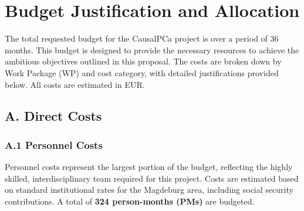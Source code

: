 \section*{Budget Justification and Allocation}

The total requested budget for the CausalPCa project is \textbf{} over a period of 36 months. This budget is designed to provide the necessary resources to achieve the ambitious objectives outlined in this proposal. The costs are broken down by Work Package (WP) and cost category, with detailed justifications provided below. All costs are estimated in EUR.

\subsection*{A. Direct Costs}

\subsubsection*{A.1 Personnel Costs}
Personnel costs represent the largest portion of the budget, reflecting the highly skilled, interdisciplinary team required for this project. Costs are estimated based on standard institutional rates for the Magdeburg area, including social security contributions. A total of \textbf{324 person-months (PMs)} are budgeted.

